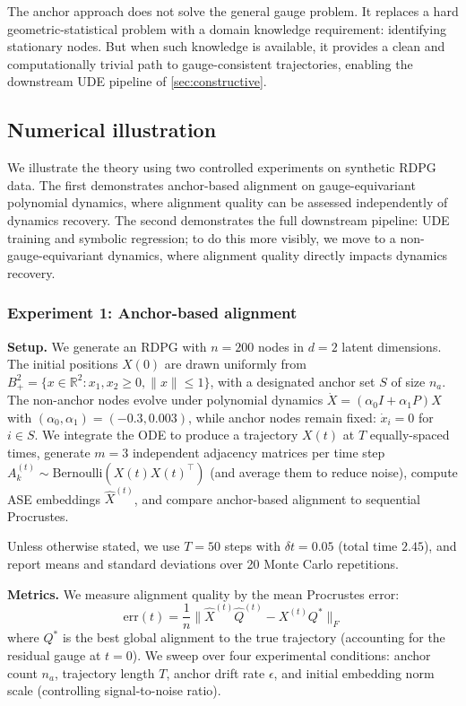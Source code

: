 \documentclass{article}
\newcommand{\RR}{\mathbb{R}}
\theoremstyle{plain}
\theoremstyle{definition}
\theoremstyle{remark}
\begin{document}
The anchor approach does not solve the general gauge problem.
It replaces a hard geometric-statistical problem with a domain knowledge requirement: identifying stationary nodes.
But when such knowledge is available, it provides a clean and computationally trivial path to gauge-consistent trajectories, enabling the downstream UDE pipeline of \cref{sec:constructive}.


\subsection{Numerical illustration}\label{sec:numerics}

We illustrate the theory using two controlled experiments on synthetic RDPG data.
The first demonstrates anchor-based alignment on gauge-equivariant polynomial dynamics, where alignment quality can be assessed independently of dynamics recovery.
The second demonstrates the full downstream pipeline: UDE training and symbolic regression; to do this more visibly, we move to a non-gauge-equivariant dynamics, where alignment quality directly impacts dynamics recovery.

\subsubsection{Experiment 1: Anchor-based alignment}\label{sec:numerics-anchor}

\textbf{Setup.}
We generate an RDPG with $n = 200$ nodes in $d = 2$ latent dimensions.
The initial positions $X(0)$ are drawn uniformly from $B_+^2 = \{x \in \RR^2 : x_1, x_2 \ge 0, \|x\| \le 1\}$, with a designated anchor set $S$ of size $n_a$.
The non-anchor nodes evolve under polynomial dynamics $\dot{X} = (\alpha_0 I + \alpha_1 P) X$ with $(\alpha_0, \alpha_1) = (-0.3, 0.003)$, while anchor nodes remain fixed: $\dot{x}_i = 0$ for $i \in S$.
We integrate the ODE to produce a trajectory $X(t)$ at $T$ equally-spaced times, generate $m = 3$ independent adjacency matrices per time step $A_k^{(t)} \sim \text{Bernoulli}(X(t) X(t)^\top)$ (and average them to reduce noise), compute ASE embeddings $\hat{X}^{(t)}$, and compare anchor-based alignment to sequential Procrustes.

Unless otherwise stated, we use $T = 50$ steps with $\delta t = 0.05$ (total time $2.45$), and report means and standard deviations over 20 Monte Carlo repetitions.

\textbf{Metrics.}
We measure alignment quality by the mean Procrustes error:
\begin{equation}
\mathrm{err}(t) = \frac{1}{n} \|\hat{X}^{(t)} \hat{Q}^{(t)} - X^{(t)} Q^*\|_F
\end{equation}
where $Q^*$ is the best global alignment to the true trajectory (accounting for the residual gauge at $t = 0$).
We sweep over four experimental conditions: anchor count $n_a$, trajectory length $T$, anchor drift rate $\epsilon$, and initial embedding norm scale (controlling signal-to-noise ratio).
\end{document}
